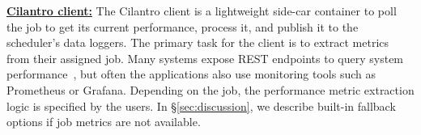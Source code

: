 \label{sec:design:cilantroclient}

\textbf{\underline{Cilantro client:}}
The Cilantro client is a lightweight side-car container  to poll the job to get its current performance,
process it, and 
publish it to the scheduler's data loggers.
% 
The primary task for the client is to extract metrics from their assigned job. Many
systems expose REST endpoints to query system performance~\cite{kuberneteshealth,
raydashboard}, but often the applications also use monitoring tools such as
Prometheus or Grafana.
Depending on the job, the performance metric extraction logic is specified by the users.
In \S\ref{sec:discussion}, we describe built-in fallback options if job metrics are not
available.




